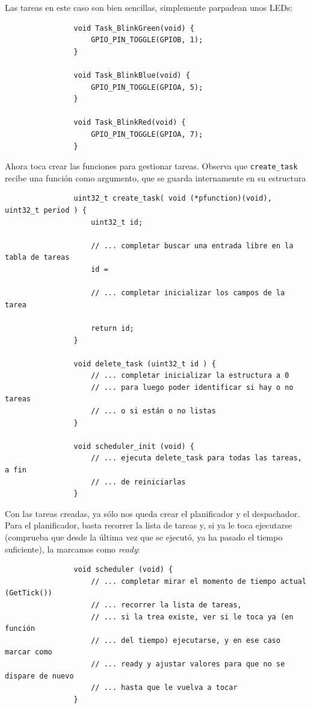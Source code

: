 \documentclass[../main.tex]{subfiles}
\begin{document}
            Las tareas en este caso son bien sencillas, simplemente parpadean unos LEDs:

            \begin{lstlisting}
                void Task_BlinkGreen(void) {
                    GPIO_PIN_TOGGLE(GPIOB, 1);
                }

                void Task_BlinkBlue(void) {
                    GPIO_PIN_TOGGLE(GPIOA, 5);
                }

                void Task_BlinkRed(void) {
                    GPIO_PIN_TOGGLE(GPIOA, 7);
                }
            \end{lstlisting}

            Ahora toca crear las funciones para gestionar tareas. Observa que \texttt{create\_task} recibe una función como argumento, que se guarda internamente en su estructura

            \begin{lstlisting}
                uint32_t create_task( void (*pfunction)(void), uint32_t period ) {
                    uint32_t id;

                    // ... completar buscar una entrada libre en la tabla de tareas
                    id = 

                    // ... completar inicializar los campos de la tarea

                    return id;
                }

                void delete_task (uint32_t id ) {
                    // ... completar inicializar la estructura a 0 
                    // ... para luego poder identificar si hay o no tareas
                    // ... o si están o no listas
                }

                void scheduler_init (void) {
                    // ... ejecuta delete_task para todas las tareas, a fin 
                    // ... de reiniciarlas
                }
            \end{lstlisting}

            Con las tareas creadas, ya sólo nos queda crear el planificador y el despachador. Para el planificador, basta recorrer la lista de tareas y, si ya le toca ejecutarse (comprueba que desde la última vez que se ejecutó, ya ha pasado el tiempo suficiente), la marcamos como \emph{ready}:

            \begin{lstlisting}
                void scheduler (void) {
                    // ... completar mirar el momento de tiempo actual (GetTick())
                    // ... recorrer la lista de tareas, 
                    // ... si la trea existe, ver si le toca ya (en función
                    // ... del tiempo) ejecutarse, y en ese caso marcar como
                    // ... ready y ajustar valores para que no se dispare de nuevo
                    // ... hasta que le vuelva a tocar
                }
            \end{lstlisting}
\end{document}
